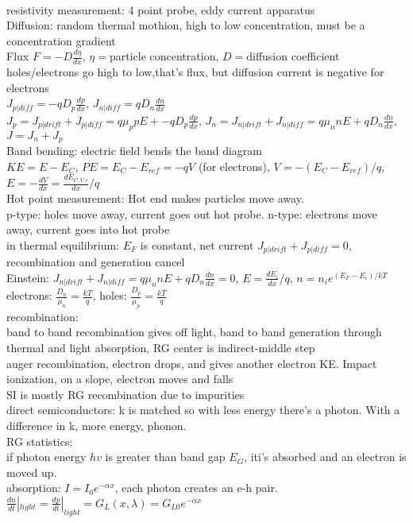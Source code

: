 \documentclass{article}
\begin{document}
\begin{large}
\\resistivity measurement: 4 point probe, eddy current apparatus
\\Diffusion: random thermal mothion, high to low concentration, must be a concentration gradient
\\Flux $F=-D\frac{d\eta}{dx}$, $\eta=$particle concentration, $D=$diffusion coefficient
\\holes/electrons go high to low,that's flux, but diffusion current is negative for electrons
\\$J_{p|diff}=-qD_p\frac{dp}{dx}$, $J_{n|diff}=qD_n\frac{dn}{dx}$
\\$J_p=J_{p|drift}+J_{p|diff}=q\mu_ppE+-qD_p\frac{dp}{dx}$, $J_n=J_{n|drift}+J_{n|diff}=q\mu_nnE+qD_n\frac{dn}{dx}$, $J=J_n+J_p$
\\Band bending: electric field bends the band diagram
\\$KE=E-E_C$, $PE=E_C-E_{ref}=-qV$ (for electrons), $V=-(E_C-E_{ref})/q$, $E=-\frac{dV}{dx}=\frac{dE_{C,V,i}}{dx}/q$
\\Hot point measurement: Hot end makes particles move away. 
\\p-type: holes move away, current goes out hot probe. n-type: electrons move away, current goes into hot probe
\\in thermal equilibrium: $E_F$ is constant, net current $J_{p|drift}+J_{p|diff}=0$, recombination and generation cancel
\\Einstein: $J_{n|drift}+J_{n|diff}=q\mu_nnE+qD_n\frac{dn}{dx}=0$, $E=\frac{dE_i}{dx}/q$, $n=n_ie^{(E_F-E_i)/kT}$
\\electrons: $\frac{D_n}{\mu_n}=\frac{kT}{q}$, holes: $\frac{D_p}{\mu_p}=\frac{kT}{q}$
\\recombination:
\\band to band recombination gives off light, band to band generation through thermal and light absorption, RG center is indirect-middle step
\\auger recombination, electron drops, and gives another electron KE. Impact ionization, on a slope, electron moves and falls
\\SI is mostly RG recombination due to impurities
\\direct semiconductors: k is matched so with less energy there's a photon. With a difference in k, more energy, phonon.
\\RG statistics:
\\if photon energy $hv$ is greater than band gap $E_G$, iti's absorbed and an electron is moved up.
\\absorption: $I=I_0e^{-\alpha x}$, each photon creates an e-h pair. $\frac{dn}{dt}|_{light}=\frac{dp}{dt}|_{light}=G_L(x,\lambda)=G_{L0}e^{-\alpha x}$

\end{large}
\end{document}

